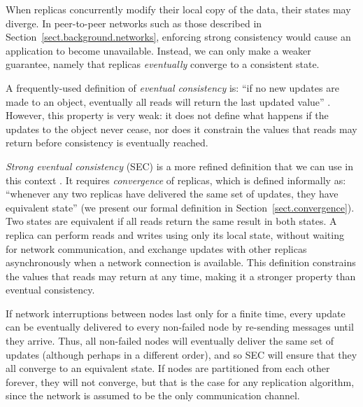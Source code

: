 When replicas concurrently modify their local copy of the data, their states may diverge. In
peer-to-peer networks such as those described in Section~\ref{sect.background.networks}, enforcing
strong consistency would cause an application to become unavailable. Instead, we can only make a
weaker guarantee, namely that replicas \emph{eventually} converge to a consistent state.

A frequently-used definition of \emph{eventual consistency} is: ``if no new updates are made to an
object, eventually all reads will return the last updated value''
\cite{Bailis:2013jc,Burckhardt:2014hy,Terry:1994fp,Vogels:2009ca}. However, this property is very
weak: it does not define what happens if the updates to the object never cease, nor does it
constrain the values that reads may return before consistency is eventually reached.

\emph{Strong eventual consistency} (SEC) is a more refined definition that we can use in this
context \cite{Shapiro:2011un}. It requires \emph{convergence} of replicas, which is defined
informally as: ``whenever any two replicas have delivered the same set of updates, they have
equivalent state'' (we present our formal definition in Section~\ref{sect.convergence}). Two states
are equivalent if all reads return the same result in both states. A replica can perform reads and
writes using only its local state, without waiting for network communication, and exchange updates
with other replicas asynchronously when a network connection is available. This definition
constrains the values that reads may return at any time, making it a stronger property than eventual
consistency.

If network interruptions between nodes last only for a finite time, every update can be eventually
delivered to every non-failed node by re-sending messages until they arrive. Thus, all non-failed
nodes will eventually deliver the same set of updates (although perhaps in a different order), and
so SEC will ensure that they all converge to an equivalent state. If nodes are partitioned from each
other forever, they will not converge, but that is the case for any replication algorithm, since the
network is assumed to be the only communication channel.
